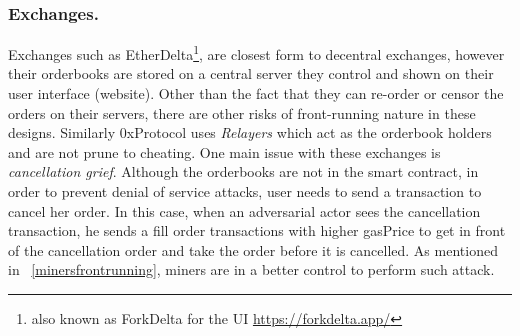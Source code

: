 \subsubsection{Exchanges.} \label{sec:frontrunningExchanges}
Exchanges such as EtherDelta\footnote{also known as ForkDelta for the UI \url{https://forkdelta.app/}}, are closest form to decentral exchanges, however their orderbooks are stored on a central server they control and shown on their user interface (website). Other than the fact that they can re-order or censor the orders on their servers, there are other risks of front-running nature in these designs. Similarly 0xProtocol uses \textit{Relayers} which act as the orderbook holders and are not prune to cheating. One main issue with these exchanges is \textit{cancellation grief}. Although the orderbooks are not in the smart contract, in order to prevent denial of service attacks, user needs to send a transaction to cancel her order. In this case, when an adversarial actor sees the cancellation transaction, he sends a fill order transactions with higher gasPrice to get in front of the cancellation order and take the order before it is cancelled. As mentioned in ~\ref{minersfrontrunning}, miners are in a better control to perform such attack. 


